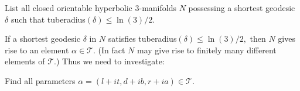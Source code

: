\begin{problem}\label{GMT 1.14}
List all closed orientable hyperbolic $3$-manifolds $N$
possessing a shortest geodesic $\delta$ such that tuberadius$(\delta)\le \ln(3)/2.$
\end{problem}

\begin{remark}\label{GMT 1.15}
If a shortest geodesic $\delta$ in $N$ satisfies tuberadius$(\delta)\le
\ln(3)/2,$ then $N$ gives
rise to an element $\alpha\in \mathcal {T}.$  (In fact $N$ may give rise to finitely many different elements of $\mathcal {T}.$)  
Thus we need to investigate:
\end{remark}

\begin{problem}\label{GMT 1.16}
Find all parameters $\alpha=(l+it, d+ib, r+ia) \in \mathcal {T}.$ 
\end{problem}

